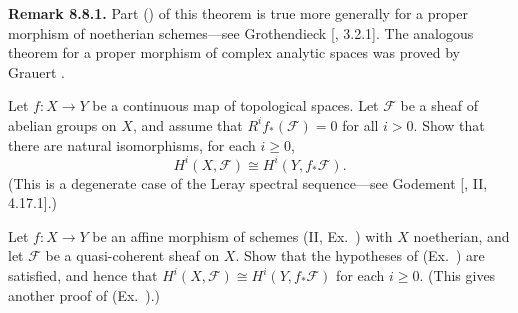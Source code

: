 {\medskip
\noindent\hypertarget{result-III-8.8.1}{}\textbf{Remark 8.8.1.} Part () of this theorem is true more generally for a proper morphism of noetherian schemes---see Grothendieck [, 3.2.1]. The analogous theorem for a proper morphism of complex analytic spaces was proved by Grauert .

\Exercises
{\fontsize{9}{10.8}\selectfont\setlength{\parskip}{0pt}
\begin{description}[style=multiline,labelwidth=1.82em,leftmargin=2.15em,itemsep=4pt,topsep=0pt,parsep=0pt]
\item[\hypertarget{ex-III-8.1}{}8.1.] Let $f\colon X\to Y$ be a continuous map of topological spaces. Let $\mathcal F$ be a sheaf of abelian groups on $X$, and assume that $R^if_*(\mathcal F)=0$ for all $i>0$. Show that there are natural isomorphisms, for each $i\ge0$,
\[
H^i(X,\mathcal F)\cong H^i(Y,f_*\mathcal F).
\]
(This is a degenerate case of the Leray spectral sequence---see Godement [, II, 4.17.1].)
\item[\hypertarget{ex-III-8.2}{}8.2.] Let $f\colon X\to Y$ be an affine morphism of schemes (II, Ex.~) with $X$ noetherian, and let $\mathcal F$ be a quasi-coherent sheaf on $X$. Show that the hypotheses of (Ex.~) are satisfied, and hence that $H^i(X,\mathcal F)\cong H^i(Y,f_*\mathcal F)$ for each $i\ge0$. (This gives another proof of (Ex.~).)
\end{description}
}
}
